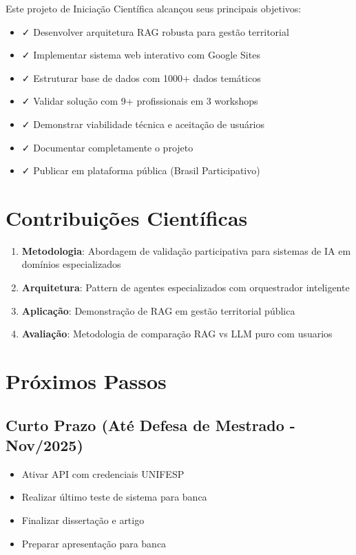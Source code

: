 \documentclass[12pt,a4paper]{report}
\begin{document}
Este projeto de Iniciação Científica alcançou seus principais objetivos:

\begin{itemize}
  \item ✓ Desenvolver arquitetura RAG robusta para gestão territorial
  \item ✓ Implementar sistema web interativo com Google Sites
  \item ✓ Estruturar base de dados com 1000+ dados temáticos
  \item ✓ Validar solução com 9+ profissionais em 3 workshops
  \item ✓ Demonstrar viabilidade técnica e aceitação de usuários
  \item ✓ Documentar completamente o projeto
  \item ✓ Publicar em plataforma pública (Brasil Participativo)
\end{itemize}

\section{Contribuições Científicas}

\begin{enumerate}
  \item \textbf{Metodologia}: Abordagem de validação participativa para sistemas de IA em domínios especializados
  \item \textbf{Arquitetura}: Pattern de agentes especializados com orquestrador inteligente
  \item \textbf{Aplicação}: Demonstração de RAG em gestão territorial pública
  \item \textbf{Avaliação}: Metodologia de comparação RAG vs LLM puro com usuarios
\end{enumerate}

\section{Próximos Passos}

\subsection{Curto Prazo (Até Defesa de Mestrado - Nov/2025)}

\begin{itemize}
  \item Ativar API com credenciais UNIFESP
  \item Realizar último teste de sistema para banca
  \item Finalizar dissertação e artigo
  \item Preparar apresentação para banca
\end{itemize}
\end{document}
